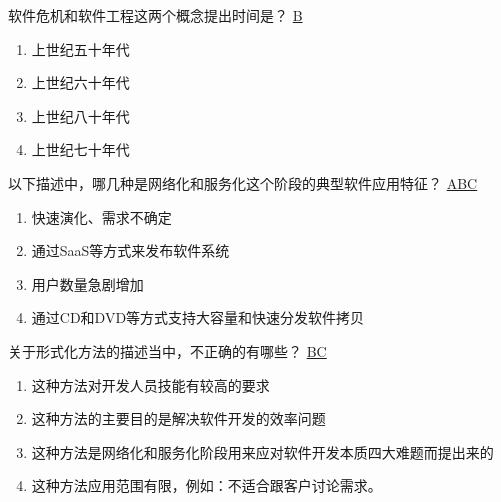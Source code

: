 \begin{problem}
    软件危机和软件工程这两个概念提出时间是？
    \uline{B}    
    \vspace{-0.8em}
    \begin{multicols}{4}
        \begin{enumerate}[label=\Alph*.]
            \item 上世纪五十年代
            \item 上世纪六十年代
            \item 上世纪八十年代
            \item 上世纪七十年代
        \end{enumerate}
    \end{multicols}
    \vspace{-1em}
\end{problem}



\begin{problem}
    ‍以下描述中，哪几种是网络化和服务化这个阶段的典型软件应用特征？
    \uline{ABC}    
        \begin{enumerate}[label=\Alph*.]
            \item 快速演化、需求不确定
            \item 通过SaaS等方式来发布软件系统
            \item 用户数量急剧增加
            \item 通过CD和DVD等方式支持大容量和快速分发软件拷贝
        \end{enumerate}
\end{problem}


\begin{problem}
    ‌关于形式化方法的描述当中，不正确的有哪些？
    \uline{BC}    
        \begin{enumerate}[label=\Alph*.]
            \item 这种方法对开发人员技能有较高的要求
            \item 这种方法的主要目的是解决软件开发的效率问题
            \item 这种方法是网络化和服务化阶段用来应对软件开发本质四大难题而提出来的
            \item 这种方法应用范围有限，例如：不适合跟客户讨论需求。
        \end{enumerate}
\end{problem}



